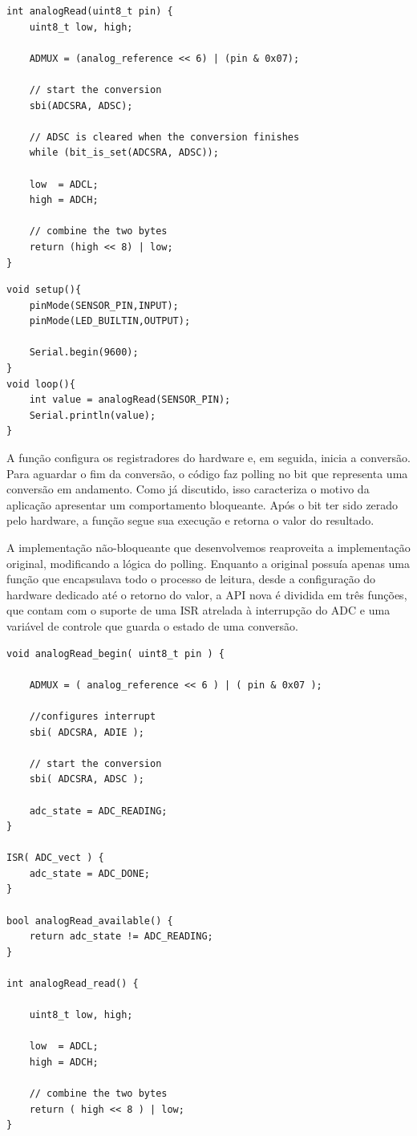 \documentclass{article}
\begin{document}
\begin{lstlisting}[style=CStyle,label=analogblock,caption=Leitura analógica bloqueante]
int analogRead(uint8_t pin) {
	uint8_t low, high;

	ADMUX = (analog_reference << 6) | (pin & 0x07);

	// start the conversion
	sbi(ADCSRA, ADSC);

	// ADSC is cleared when the conversion finishes
	while (bit_is_set(ADCSRA, ADSC));

	low  = ADCL;
	high = ADCH;

	// combine the two bytes
	return (high << 8) | low;
}
\end{lstlisting}
\begin{lstlisting}[style=CStyle,label=analogblockapp,caption=Aplicação utilizando driver bloqueante]
void setup(){
    pinMode(SENSOR_PIN,INPUT);
    pinMode(LED_BUILTIN,OUTPUT);

    Serial.begin(9600);
}
void loop(){
    int value = analogRead(SENSOR_PIN);
    Serial.println(value);
}
\end{lstlisting}
\par A função configura os registradores do hardware e, em seguida, inicia a conversão. Para aguardar o fim da conversão, o código faz polling no bit que representa uma conversão em andamento. Como já discutido, isso caracteriza o motivo da aplicação apresentar um comportamento bloqueante. Após o bit ter sido zerado pelo hardware, a função segue sua execução e retorna o valor do resultado. 
\par A implementação não-bloqueante que desenvolvemos reaproveita a implementação original, modificando a lógica do polling. Enquanto a original possuía apenas uma função que encapsulava todo o processo de leitura, desde a configuração do hardware dedicado até o retorno do valor, a API nova é dividida em três funções, que contam com o suporte de uma ISR atrelada à interrupção do ADC e uma variável de controle que guarda o estado de uma conversão.
\begin{lstlisting}[style=CStyle,label=analognonblock,caption=Leitura analógica não-bloqueante]
void analogRead_begin( uint8_t pin ) {

	ADMUX = ( analog_reference << 6 ) | ( pin & 0x07 );

	//configures interrupt
	sbi( ADCSRA, ADIE );

	// start the conversion
	sbi( ADCSRA, ADSC );

	adc_state = ADC_READING;
}

ISR( ADC_vect ) {
	adc_state = ADC_DONE;
}

bool analogRead_available() {
	return adc_state != ADC_READING;
}

int analogRead_read() {

	uint8_t low, high;

	low  = ADCL;
	high = ADCH;

	// combine the two bytes
	return ( high << 8 ) | low;
}
\end{lstlisting}
\end{document}
